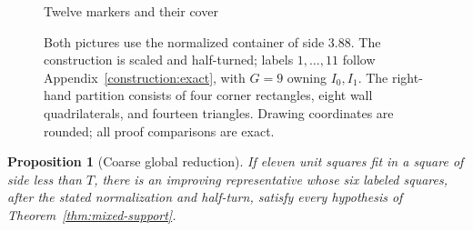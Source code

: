 \documentclass[11pt]{article}
\newtheorem{proposition}[theorem]{Proposition}
\begin{document}
\begin{figure}[htbp]
\begin{minipage}[t]{.47\textwidth}
\par\small Twelve markers and their cover
\end{minipage}
\caption{Both pictures use the normalized container of side $3.88$. The construction is scaled and half-turned; labels $1,\ldots,11$ follow Appendix~\ref{construction:exact}, with $G=9$ owning $I_0,I_1$. The right-hand partition consists of four corner rectangles, eight wall quadrilaterals, and fourteen triangles. Drawing coordinates are rounded; all proof comparisons are exact.}
\label{fig:packing-markers}\end{figure}
\begin{proposition}[Coarse global reduction]\label{input:global}
If eleven unit squares fit in a square of side less than $T$, there is an
improving representative whose six labeled squares, after the stated
normalization and half-turn, satisfy every hypothesis of
Theorem~\ref{thm:mixed-support}.
\end{proposition}
\end{document}
